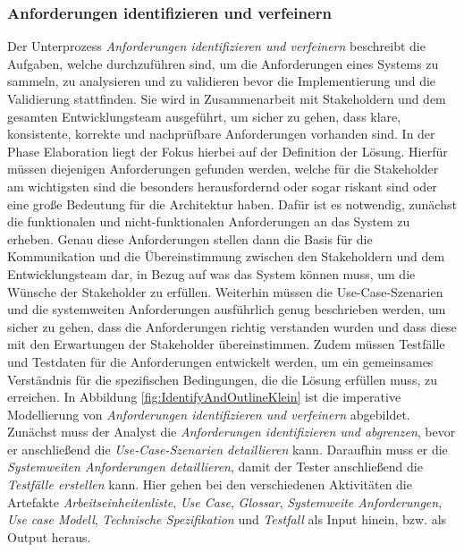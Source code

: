 \subsubsection{Anforderungen identifizieren und verfeinern}
 Der Unterprozess \textit{Anforderungen identifizieren und verfeinern} beschreibt die Aufgaben, welche durchzuführen sind, um die Anforderungen eines Systems zu sammeln, zu analysieren und zu validieren bevor die Implementierung und die Validierung stattfinden. Sie wird in Zusammenarbeit mit Stakeholdern und dem gesamten Entwicklungsteam ausgeführt, um sicher zu gehen, dass klare, konsistente, korrekte und nachprüfbare Anforderungen vorhanden sind.\newline
 In der Phase Elaboration liegt der Fokus hierbei auf der Definition der Lösung. Hierfür müssen diejenigen Anforderungen gefunden werden, welche für die Stakeholder am wichtigsten sind die besonders herausfordernd oder sogar riskant sind oder eine große Bedeutung für die Architektur haben.\newline
 Dafür ist es notwendig, zunächst die funktionalen und nicht-funktionalen Anforderungen an das System zu erheben. Genau diese Anforderungen stellen dann die Basis für die Kommunikation und die Übereinstimmung zwischen den Stakeholdern und dem Entwicklungsteam dar, in Bezug auf was das System können muss, um die Wünsche der Stakeholder zu erfüllen.\newline
 Weiterhin müssen die Use-Case-Szenarien und die systemweiten Anforderungen ausführlich genug beschrieben werden, um sicher zu gehen, dass die Anforderungen richtig verstanden wurden und dass diese mit den Erwartungen der Stakeholder übereinstimmen.\newline
 Zudem müssen Testfälle und Testdaten für die Anforderungen entwickelt werden, um ein gemeinsames Verständnis für die spezifischen Bedingungen, die die Lösung erfüllen muss, zu erreichen.
 In Abbildung \ref{fig:IdentifyAndOutlineKlein} ist die imperative Modellierung von \textit{Anforderungen identifizieren und verfeinern} abgebildet. \newline
 Zunächst muss der Analyst die \textit{Anforderungen identifizieren und abgrenzen}, bevor er anschließend die \textit{Use-Case-Szenarien detaillieren} kann. Daraufhin muss er die \textit{Systemweiten Anforderungen detaillieren}, damit der Tester anschließend die \textit{Testfälle erstellen} kann.\newline
 Hier gehen bei den verschiedenen Aktivitäten die Artefakte \textit{Arbeitseinheitenliste}, \textit{Use Case}, \textit{Glossar}, \textit{Systemweite Anforderungen}, \textit{Use case Modell}, \textit{Technische Spezifikation} und \textit{Testfall} als Input hinein, bzw. als Output heraus.
 
